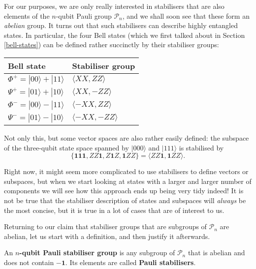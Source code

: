 \documentclass[fleqn]{article}
\newenvironment{idea}{\noindent}{\medskip}
\begin{document}
For our purposes, we are only really interested in stabilisers that are also elements of the \(n\)-qubit Pauli group \(\mathcal{P}_n\), and we shall soon see that these form an \emph{abelian} group.
It turns out that such stabilisers can describe highly entangled states.
In particular, the four Bell states (which we first talked about in Section \ref{bell-states}) can be defined rather succinctly by their stabiliser groups:

\begin{longtable}[]{@{}ll@{}}
\toprule()
Bell state & Stabiliser group \\
\midrule()
\endhead
\(\Phi^+=|00\rangle+|11\rangle\) & \(\langle XX,ZZ\rangle\) \\
\(\Psi^+=|01\rangle+|10\rangle\) & \(\langle XX,-ZZ\rangle\) \\
\(\Phi^-=|00\rangle-|11\rangle\) & \(\langle -XX,ZZ\rangle\) \\
\(\Psi^-=|01\rangle-|10\rangle\) & \(\langle -XX,-ZZ\rangle\) \\
\bottomrule()
\end{longtable}

Not only this, but some vector spaces are also rather easily defined: the subspace of the three-qubit state space spanned by \(|000\rangle\) and \(|111\rangle\) is stabilised by
\[
  \{\mathbf{1}\mathbf{1}\mathbf{1},ZZ\mathbf{1},Z\mathbf{1}Z,\mathbf{1}ZZ\} = \langle ZZ\mathbf{1},\mathbf{1}ZZ\rangle.
\]

Right now, it might seem more complicated to use stabilisers to define vectors or subspaces, but when we start looking at states with a larger and larger number of components we will see how this approach ends up being very tidy indeed!
It is not be true that the stabiliser description of states and subspaces will \emph{always} be the most concise, but it is true in a lot of cases that are of interest to us.

Returning to our claim that stabiliser groups that are subgroups of \(\mathcal{P}_n\) are abelian, let us start with a definition, and then justify it afterwards.

\begin{idea}
An \textbf{\(n\)-qubit Pauli stabiliser group} is any subgroup of \(\mathcal{P}_n\) that is abelian and does not contain \(-\mathbf{1}\).
Its elements are called \textbf{Pauli stabilisers}.

\end{idea}
\end{document}
